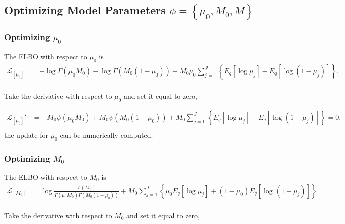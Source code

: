 \documentclass[11pt,reqno]{amsart}
\begin{document}
\subsection{Optimizing Model Parameters $ \phi = \left\lbrace \mu_0, M_0, M \right\rbrace  $}

\subsubsection{Optimizing $ \mu_0 $}
The ELBO with respect to $ \mu_0 $ is
\begin{equation}
\begin{split}
\label{mu_0}
\mathcal{L}_{[\mu_0]} 
&= -\log  \Gamma(\mu_0 M_0) - \log \Gamma(M_0 (1-\mu_0)) 
+ M_0\mu_0\sum_{j=1}^{J} \left\lbrace E_q  \left[ \log \mu_j \right] 
- E_q  \left[ \log (1 - \mu_j)\right]\right\rbrace . \\
\end{split}
\end{equation}

Take the derivative with respect to $ \mu_0 $ and set it equal to zero,

\begin{equation}
\begin{split}
\label{mu_0}
\mathcal{L}_{[\mu_0]}' 
&= -M_0 \psi(\mu_0 M_0) + M_0 \psi(M_0 (1-\mu_0)) 
+ M_0\sum_{j=1}^{J} \left\lbrace E_q  \left[ \log \mu_j \right] 
- E_q  \left[ \log (1 - \mu_j)\right]\right\rbrace =0 , \\
\end{split}
\end{equation}
the update for $ \mu_0 $ can be numerically computed.

\subsubsection{Optimizing $ M_0 $}
The ELBO with respect to $ M_0 $ is
\begin{equation}
\begin{split}
\label{M_0}
\mathcal{L}_{[M_0]} 
&= \log \frac{ \Gamma(M_0) } { \Gamma(\mu_0 M_0) \Gamma(M_0 (1-\mu_0))}  
+ M_0 \sum_{j=1}^{J} \left\lbrace \mu_0E_q  \left[ \log \mu_j \right] + ( 1 - \mu_0) E_q  \left[ \log (1 - \mu_j)\right]\right\rbrace  \\
\end{split}
\end{equation}

Take the derivative with respect to $ M_0 $ and set it equal to zero,
\end{document}
